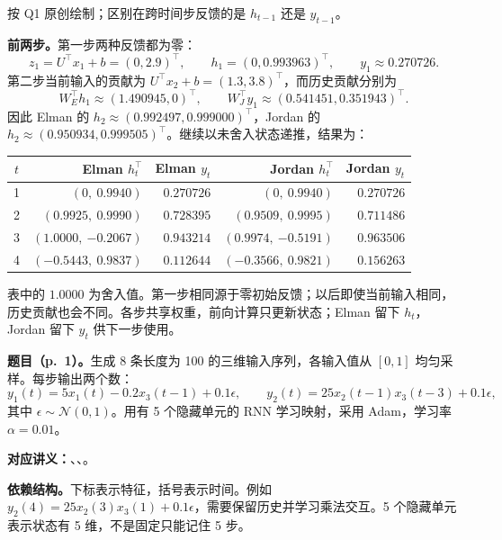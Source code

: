 \begin{center}


{\small 按 Q1 原创绘制；区别在跨时间步反馈的是 $h_{t-1}$ 还是 $y_{t-1}$。}
\end{center}

\textbf{前两步。}第一步两种反馈都为零：
\[
 z_1=U^\top x_1+b=(0,2.9)^\top,\qquad
 h_1=(0,0.993963)^\top,\qquad y_1\approx0.270726.
\]
第二步当前输入的贡献为 $U^\top x_2+b=(1.3,3.8)^\top$，而历史贡献分别为
\[
 W_E^\top h_1\approx(1.490945,0)^\top,\qquad
 W_J^\top y_1\approx(0.541451,0.351943)^\top.
\]
因此 Elman 的 $h_2\approx(0.992497,0.999000)^\top$，Jordan 的 $h_2\approx(0.950934,0.999505)^\top$。继续以未舍入状态递推，结果为：
\begin{center}
\small
\setlength{\tabcolsep}{5pt}
\begin{tabular}{@{}crrrr@{}}
\toprule
$t$ & Elman $h_t^\top$ & Elman $y_t$ & Jordan $h_t^\top$ & Jordan $y_t$ \\
\midrule
1 & $(0,\ 0.9940)$ & $0.270726$ & $(0,\ 0.9940)$ & $0.270726$ \\
2 & $(0.9925,\ 0.9990)$ & $0.728395$ & $(0.9509,\ 0.9995)$ & $0.711486$ \\
3 & $(1.0000,\ {-0.2067})$ & $0.943214$ & $(0.9974,\ {-0.5191})$ & $0.963506$ \\
4 & $({-0.5443},\ 0.9837)$ & $0.112644$ & $({-0.3566},\ 0.9821)$ & $0.156263$ \\
\bottomrule
\end{tabular}
\end{center}
表中的 $1.0000$ 为舍入值。第一步相同源于零初始反馈；以后即使当前输入相同，历史贡献也会不同。各步共享权重，前向计算只更新状态；Elman 留下 $h_t$，Jordan 留下 $y_t$ 供下一步使用。

\nopagebreak[4]
\textbf{题目（p.~1）。}生成 8 条长度为 100 的三维输入序列，各输入值从 $[0,1]$ 均匀采样。每步输出两个数：
\[
 y_1(t)=5x_1(t)-0.2x_3(t-1)+0.1\epsilon,\qquad
 y_2(t)=25x_2(t-1)x_3(t-3)+0.1\epsilon,
\]
其中 $\epsilon\sim\mathcal N(0,1)$。用有 5 个隐藏单元的 RNN 学习映射，采用 Adam，学习率 $\alpha=0.01$。

\textbf{对应讲义：}、、。

\textbf{依赖结构。}下标表示特征，括号表示时间。例如 $y_2(4)=25x_2(3)x_3(1)+0.1\epsilon$，需要保留历史并学习乘法交互。5 个隐藏单元表示状态有 5 维，不是固定只能记住 5 步。

